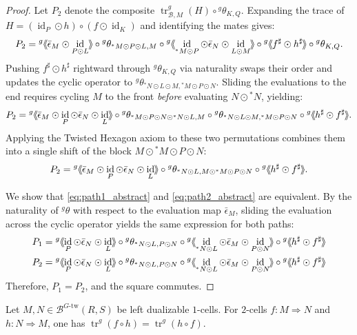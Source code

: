 \documentclass[11pt,oneside]{amsart}
\DeclareMathOperator{\tr}{tr}
\DeclareMathOperator{\id}{id}
\numberwithin{equation}{section}
\numberwithin{figure}{section}
\theoremstyle{plain}
\theoremstyle{definition}
\theoremstyle{remark}
\newcommand{\shspace}{\hspace{.5mm}} %
\newcommand{\sh}[1]{{\ensuremath{\shspace\hspace{1mm}\makebox[-1mm]{$\langle$}\makebox[0mm]{$\langle$}\hspace{1mm}{#1}\makebox[1mm]{$\rangle$}\makebox[0mm]{$\rangle$}\shspace}}}
\begin{document}
\begin{proof}
 
Let $P_2$ denote the composite $\operatorname{tr}_{\mathcal{B},M}^g(H) \circ {}^g\theta_{K,Q}$. Expanding the trace of $H = (\id_P \odot h) \circ (f \odot \id_K)$ and identifying the mates gives:
\[
P_2 = {}^g\sh{\bar{\epsilon}_M \odot \id_{P \odot L}} \circ {}^g\theta_{{}^*M \odot P \odot L, M} \circ {}^g\sh{\id_{{}^*M \odot P} \odot \bar{\epsilon}_N \odot \id_{L \odot M}} \circ {}^g\sh{f^\sharp \odot h^\sharp} \circ {}^g\theta_{K,Q}.
\]
Pushing $f^\sharp \odot h^\sharp$ rightward through ${}^g\theta_{K,Q}$ via naturality swaps their order and updates the cyclic operator to ${}^g\theta_{{}^*N \odot L \odot M, {}^*M \odot P \odot N}$. Sliding the evaluations to the end requires cycling $M$ to the front \emph{before} evaluating $N \odot {}^*N$, yielding:
\[
P_2 = {}^g\sh{\bar{\epsilon}_M \odot \id_P \odot \bar{\epsilon}_N \odot \id_L} \circ {}^g\theta_{{}^*M \odot P \odot N \odot {}^*N \odot L, M} \circ {}^g\theta_{{}^*N \odot L \odot M, {}^*M \odot P \odot N} \circ {}^g\sh{h^\sharp \odot f^\sharp}.
\]
Applying the Twisted Hexagon axiom to these two permutations combines them into a single shift of the block $M \odot {}^*M \odot P \odot N$:
\begin{equation}\label{eq:path2_abstract}
P_2 = {}^g\sh{\bar{\epsilon}_M \odot \id_P \odot \bar{\epsilon}_N \odot \id_L} \circ {}^g\theta_{{}^*N \odot L, M \odot {}^*M \odot P \odot N} \circ {}^g\sh{h^\sharp \odot f^\sharp}.
\end{equation}

We show that \eqref{eq:path1_abstract} and \eqref{eq:path2_abstract} are equivalent. By the naturality of ${}^g\theta$ with respect to the evaluation map $\bar{\epsilon}_M$, sliding the evaluation across the cyclic operator yields the same expression for both paths:
\begin{align*}
P_1 &= {}^g\sh{\id_P \odot \bar{\epsilon}_N \odot \id_L} \circ {}^g\theta_{{}^*N \odot L, P \odot N} \circ {}^g\sh{\id_{{}^*N \odot L} \odot \bar{\epsilon}_M \odot \id_{P \odot N}} \circ {}^g\sh{h^\sharp \odot f^\sharp} \\
P_2 &= {}^g\sh{\id_P \odot \bar{\epsilon}_N \odot \id_L} \circ {}^g\theta_{{}^*N \odot L, P \odot N} \circ {}^g\sh{\id_{{}^*N \odot L} \odot \bar{\epsilon}_M \odot \id_{P \odot N}} \circ {}^g\sh{h^\sharp \odot f^\sharp}
\end{align*}
Therefore, $P_1 = P_2$, and the square commutes.
\end{proof}

\begin{cor}\label{cor:twisted_cyclicity}
Let \(M,N\in\mathcal B^{G\text{-tw}}(R,S)\) be left dualizable
\(1\)-cells.  For \(2\)-cells
\(f\colon M\Rightarrow N\) and \(h\colon N\Rightarrow M\), one has
\(
\tr^g(f\circ h)=\tr^g(h\circ f).
\)
\end{cor}
\end{document}

